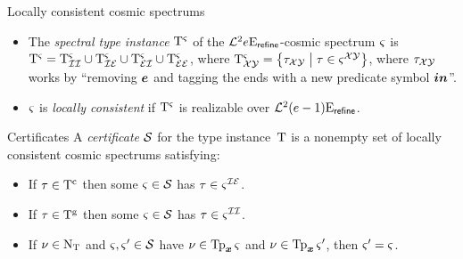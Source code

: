 \documentclass{beamer}
\begin{document}
\begin{frame}{Locally consistent cosmic spectrums}
\begin{itemize}
\item The \emph{spectral type instance} $\mathrm{T}^{\varsigma}$ of the
$\mathcal{L}^{2}{e}\mathrm{E}_{\mathsf{refine}}$-cosmic spectrum $\varsigma$ is $\mathrm{T}^{\varsigma} = \mathrm{T}^{\varsigma}_{\mathcal{I}\mathcal{I}} \cup \mathrm{T}^{\varsigma}_{\mathcal{I}\mathcal{E}} \cup \mathrm{T}^{\varsigma}_{\mathcal{E}\mathcal{I}} \cup \mathrm{T}^{\varsigma}_{\mathcal{E}\mathcal{E}}$,
where $\mathrm{T}^{\varsigma}_{\mathcal{X}{\mathcal{Y}}} =
\left\{\tau_{\mathcal{X}{\mathcal{Y}}}\mathrel{}\middle|\mathrel{}\tau\in\varsigma^{\mathcal{X}\mathcal{Y}}\right\}$,
where $\tau_{\mathcal{X}{\mathcal{Y}}}$ works by ``removing $\bm{e}$ and tagging
the ends with a new predicate symbol $\bm{in}$''.

\item $\varsigma$ is \emph{locally consistent} if $\mathrm{T}^{\varsigma}$ is realizable over
$\mathcal{L}^{2}{(e-1)}\mathrm{E}_{\mathsf{refine}}$.

\end{itemize}
\end{frame}

\begin{frame}{Certificates}
A \emph{certificate} $\mathcal{S}$ for the type instance~$\mathrm{T}$ is a nonempty set of
locally consistent cosmic spectrums satisfying:
\begin{itemize}
  \item[\condcertTc]\label{cond:certTc}
  If $\tau\in\mathrm{T}^{\mathrm{c}}$ then some $\varsigma\in\mathcal{S}$ has $\tau\in\varsigma^{\mathcal{I}\mathcal{E}}$.
  \item[\condcertTg]\label{cond:certTg}
  If $\tau\in\mathrm{T}^{\mathrm{g}}$ then some $\varsigma\in\mathcal{S}$ has $\tau\in\varsigma^{\mathcal{I}\mathcal{I}}$.
  \item[\condcertn]\label{cond:certn}
  If $\nu\in{\mathrm{N}}_{\mathrm{T}}$ and $\varsigma,{\varsigma'}\in\mathcal{S}$ have $\nu\in\operatorname{Tp}_{\bm{x}}{\varsigma}$ and
  $\nu\in\operatorname{Tp}_{\bm{x}}{{\varsigma'}}$, then ${\varsigma'} = \varsigma$.
\end{itemize}
\end{frame}
\end{document}
